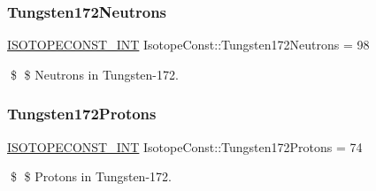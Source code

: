\subsubsection{\texorpdfstring{Tungsten172\+Neutrons}{Tungsten172Neutrons}}
{\footnotesize\ttfamily \mbox{\hyperlink{group___isotope_const-_macros_ga5f18360b3e99483a35c32d789e62621c}{I\+S\+O\+T\+O\+P\+E\+C\+O\+N\+S\+T\+\_\+\+I\+NT}} Isotope\+Const\+::\+Tungsten172\+Neutrons = 98}

\$ \$ Neutrons in Tungsten-\/172. \mbox{\label{group___isotope_const-_tungsten-_w172_ga2a2b6856295339d81b5272d7be9066c6}} 
\subsubsection{\texorpdfstring{Tungsten172\+Protons}{Tungsten172Protons}}
{\footnotesize\ttfamily \mbox{\hyperlink{group___isotope_const-_macros_ga5f18360b3e99483a35c32d789e62621c}{I\+S\+O\+T\+O\+P\+E\+C\+O\+N\+S\+T\+\_\+\+I\+NT}} Isotope\+Const\+::\+Tungsten172\+Protons = 74}

\$ \$ Protons in Tungsten-\/172. 